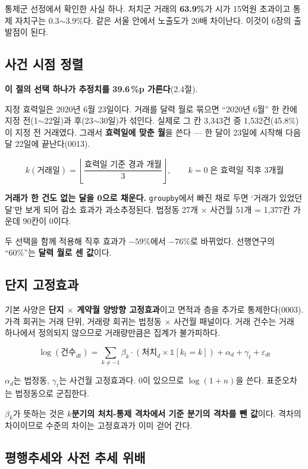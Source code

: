 통제군 선정에서 확인한 사실 하나. 처치군 거래의 \textbf{63.9\%}가 시가 15억원
초과이고 통제 자치구는 0.3$\sim$3.9\%다. 같은 서울 안에서 노출도가 20배 차이난다.
이것이 6장의 출발점이 된다.

\subsection{사건 시점 정렬}

\textbf{이 절의 선택 하나가 추정치를 39.6\,\%p 가른다}(2.4절).

지정 효력일은 2020년 6월 23일이다. 거래를 달력 월로 묶으면 ``2020년 6월'' 한 칸에
지정 전(1$\sim$22일)과 후(23$\sim$30일)가 섞인다. 실제로 그 칸 3,343건 중
1,532건(45.8\%)이 지정 전 거래였다. 그래서 \textbf{효력일에 맞춘 월}을 쓴다 ---
한 달이 23일에 시작해 다음 달 22일에 끝난다(0013).

\[
k(\text{거래일}) = \left\lfloor \frac{\text{효력일 기준 경과 개월}}{3} \right\rfloor,
\qquad k=0 \;\text{은 효력일 직후 3개월}
\]

\textbf{거래가 한 건도 없는 달을 0으로 채운다.} \texttt{groupby}에서 빠진 채로
두면 `거래가 있었던 달'만 보게 되어 감소 효과가 과소추정된다. 법정동 27개 $\times$
사건월 51개 = 1,377칸 가운데 90칸이 0이다.

두 선택을 함께 적용해 직후 효과가 $-59\%$에서 $-76\%$로 바뀌었다. 선행연구의
``60\%''는 \textbf{달력 월로 센 값}이다.

\subsection{단지 고정효과}

기본 사양은 \textbf{단지 $\times$ 계약월 양방향 고정효과}이고 면적과 층을 추가로
통제한다(0003). 가격 회귀는 거래 단위, 거래량 회귀는 법정동 $\times$ 사건월
패널이다. 거래 건수는 거래 하나에서 정의되지 않으므로 거래량만큼은 집계가
불가피하다.

\[
\log(\text{건수}_{dt}) = \sum_{k \neq -1} \beta_k \cdot
(\text{처치}_d \times \mathbb{1}[k_t = k]) + \alpha_d + \gamma_t + \varepsilon_{dt}
\]

$\alpha_d$는 법정동, $\gamma_t$는 사건월 고정효과다. 0이 있으므로
$\log(1+n)$을 쓴다. 표준오차는 법정동으로 군집한다.

$\beta_k$가 뜻하는 것은 \textbf{$k$분기의 처치-통제 격차에서 기준 분기의 격차를
뺀 값}이다. 격차의 차이이므로 수준의 차이는 고정효과가 이미 걷어 간다.

\subsection{평행추세와 사전 추세 위배}

